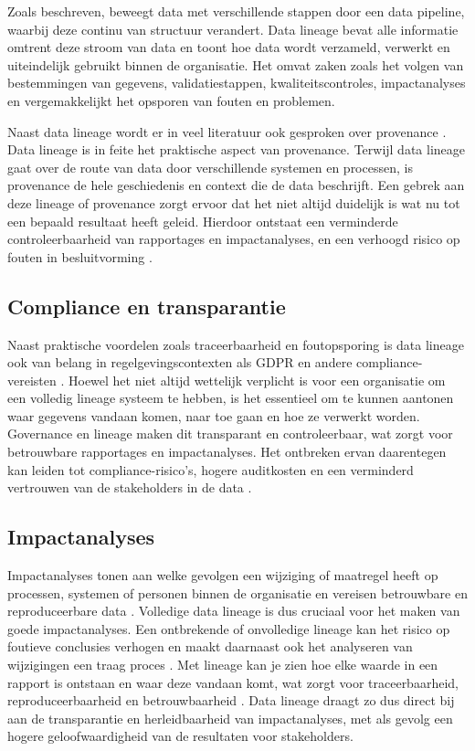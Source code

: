 Zoals \textcite{verma2024tracing} beschreven, beweegt data met verschillende stappen door een data pipeline, waarbij deze continu van structuur verandert. Data lineage bevat alle informatie omtrent deze stroom van data en toont hoe data wordt verzameld, verwerkt en uiteindelijk gebruikt binnen de organisatie. Het omvat zaken zoals het volgen van bestemmingen van gegevens, validatiestappen, kwaliteitscontroles, impactanalyses en vergemakkelijkt het opsporen van fouten en problemen.  

Naast data lineage wordt er in veel literatuur ook gesproken over provenance \autocite{Secoda2024}. Data lineage is in feite het praktische aspect van provenance. Terwijl data lineage gaat over de route van data door verschillende systemen en processen, is provenance de hele geschiedenis en context die de data beschrijft. Een gebrek aan deze lineage of provenance zorgt ervoor dat het niet altijd duidelijk is wat nu tot een bepaald resultaat heeft geleid. Hierdoor ontstaat een verminderde controleerbaarheid van rapportages en impactanalyses, en een verhoogd risico op fouten in besluitvorming \autocite{verma2024tracing}.

\subsection{Compliance en transparantie}

Naast praktische voordelen zoals traceerbaarheid en foutopsporing is data lineage ook van belang in regelgevingscontexten als GDPR en andere compliance-vereisten \autocite{Collibra2025}. Hoewel het niet altijd wettelijk verplicht is voor een organisatie om een volledig lineage systeem te hebben,  is het essentieel om te kunnen aantonen waar gegevens vandaan komen, naar toe gaan en hoe ze verwerkt worden. Governance en lineage maken dit transparant en controleerbaar, wat zorgt voor betrouwbare rapportages en impactanalyses. Het ontbreken ervan daarentegen kan leiden tot compliance-risico’s, hogere auditkosten en een verminderd vertrouwen van de stakeholders in de data \autocite{Dataversity2025}.

\subsection{Impactanalyses}

Impactanalyses tonen aan welke gevolgen een wijziging of maatregel heeft op processen, systemen of personen binnen de organisatie en vereisen betrouwbare en reproduceerbare data \autocite{verma2024tracing}. Volledige data lineage is dus cruciaal voor het maken van goede impactanalyses. Een ontbrekende of onvolledige lineage kan het risico op foutieve conclusies verhogen en maakt daarnaast ook het analyseren van wijzigingen een traag proces \autocite{bernardo2024data}. Met lineage kan je zien hoe elke waarde in een rapport is ontstaan en waar deze vandaan komt, wat zorgt voor traceerbaarheid, reproduceerbaarheid en betrouwbaarheid \autocite{wittnerlightweight}. Data lineage draagt zo dus direct bij aan de transparantie en herleidbaarheid van impactanalyses, met als gevolg een hogere geloofwaardigheid van de resultaten voor stakeholders.

